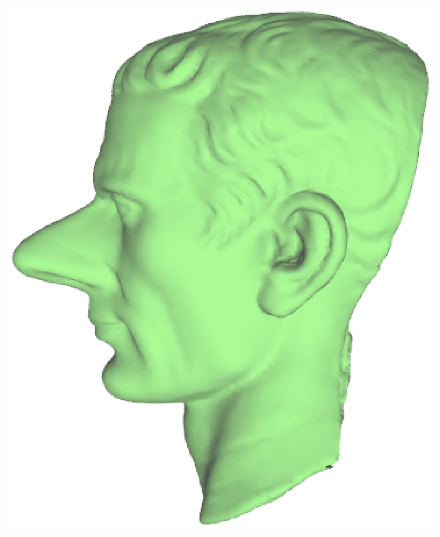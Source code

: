 \begin{figure} [htbp]
{\begin{minipage}[b]{0.32\textwidth}
      \includegraphics[scale=0.25]{figs/f5.7.8flexible-1.eps}
    \end{minipage}}
\end{figure}
